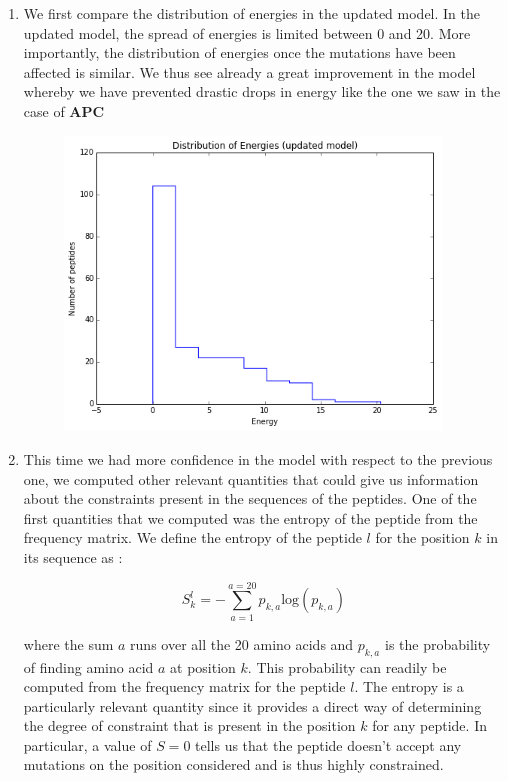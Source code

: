 \documentclass[a4paper, 12pt]{article}
\begin{document}
\begin{enumerate}
\item 
We first compare the distribution of energies in the updated model. In the updated model, the spread of energies is limited between 0 and 20. More importantly, the distribution of energies once the mutations have been affected is similar. We thus see already a great improvement in the model whereby we have prevented drastic drops in energy like the one we saw in the case of \textbf{APC} 

\begin{figure}[!h]
\label{update_model_energy}
\centering
\includegraphics[width=10cm]{Images/update_model_dist.png}
\end{figure}

\item 

This time we had more confidence in the model with respect to the previous one, we computed other relevant quantities that could give us information about the constraints present in the sequences of the peptides. One of the first quantities that we computed was the entropy of the peptide from the frequency matrix. We define the entropy of the peptide $l$ for the position $k$ in its sequence as :

\begin{equation}
\label{entropy_definition}
S^{l}_{k} = -\sum_{a=1}^{a=20} p_{k,a} \mathrm{log}(p_{k,a})
\end{equation}

where the sum $a$ runs over all the 20 amino acids and $p_{k,a}$ is the probability of finding amino acid $a$ at position $k$. This probability can readily be computed from the frequency matrix for the peptide $l$. The entropy is a particularly relevant quantity since it provides a direct way of determining the degree of constraint that is present in the position $k$ for any peptide. In particular, a value of $S=0$ tells us that the peptide doesn't accept any mutations on the position considered and is thus highly constrained. 


\end{enumerate}
\end{document}
